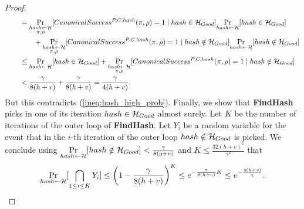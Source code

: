 \begin{proof}
\begin{align*}
  &\mbox\qquad = \underset{\substack{hash \leftarrow \mathcal{H} \\ \pi, \rho}}{\Pr}[CanonicalSuccess^{P,C,hash}(\pi, \rho) = 1 \mid hash \in \mathcal{H}_{Good}]
  \underset{hash \leftarrow \mathcal{H}}{\Pr}[hash \in \mathcal{H}_{Good}] \\
  & \mbox\qquad\qquad + \underset{\substack{hash \leftarrow \mathcal{H} \\ \pi, \rho}}{\Pr}[CanonicalSuccess^{P,C,hash}(\pi, \rho) = 1 \mid hash \notin \mathcal{H}_{Good}]
  \underset{hash \leftarrow \mathcal{H}}{\Pr}[hash \notin \mathcal{H}_{Good}] \\
  & \mbox\qquad \leq \underset{hash \leftarrow \mathcal{H}}{\Pr}[hash \in \mathcal{H}_{Good}] +
  \underset{\substack{hash \leftarrow \mathcal{H} \\ \pi, \rho}}{\Pr}[CanonicalSuccess^{P,C,hash}(\pi, \rho) = 1 \mid hash \notin \mathcal{H}_{Good}] \\
  & \mbox\qquad < \frac{\gamma}{8(h+v)} + \frac{\gamma}{8(h+v)} = \frac{\gamma}{4(h+v)}.
\end{align*}
But this contradicts (\ref{ineq:hash_high_prob}).
Finally, we show that \textbf{FindHash} picks in one of its iteration $hash \in \mathcal{H}_{Good}$ almost surely.
Let $K$ be the number of iterations of the outer loop of \textbf{FindHash}.
Let $Y_i$ be a random variable for the event
that in the $i$-th iteration of the outer loop $hash \notin \mathcal{H}_{Good}$ is picked.
We conclude using $\underset{hash \leftarrow \mathcal{H}}{\Pr}[hash \notin \mathcal{H}_{Good}] < \frac{\gamma}{8(g+v)}$ and  $K \leq \frac{32(h+v)^2}{\gamma^2}$ that
\begin{align*}
  \underset{hash \leftarrow \mathcal{H}}{\Pr}[ \bigcap_{1 \leq i \leq K} Y_i ] \leq \left(1 - \frac{\gamma}{8(h+v)}\right)^{K}
    \leq e^{-\frac{\gamma}{8(h+v)} K}
    \leq e^{-\frac{4(h+v)}{\gamma}}.
\end{align*}
\end{proof}
